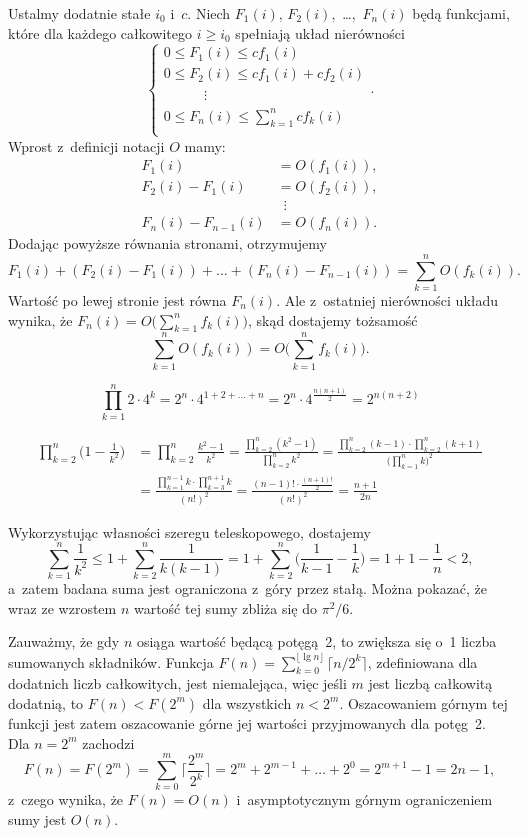 Ustalmy dodatnie stałe $i_0$ i~$c$.
Niech $F_1(i)$, $F_2(i)$,~\dots,~$F_n(i)$ będą funkcjami, które dla każdego całkowitego $i\ge i_0$ spełniają układ nierówności
\[
	\begin{cases}
		0 \le F_1(i) \le cf_1(i) \\
		0 \le F_2(i) \le cf_1(i)+cf_2(i) \\
		\phantom{0 \le F_2} \vdots \\
		0 \le F_n(i) \le \sum_{k=1}^ncf_k(i) \\
	\end{cases}.
\]
Wprost z~definicji notacji $O$ mamy:
\begin{align*}
	F_1(i) &= O(f_1(i)), \\
	F_2(i)-F_1(i) &= O(f_2(i)), \\
	& \,\,\,\vdots \\
	F_n(i)-F_{n-1}(i) &= O(f_n(i)).
\end{align*}
Dodając powyższe równania stronami, otrzymujemy
\[
	F_1(i)+(F_2(i)-F_1(i))+\dots+(F_n(i)-F_{n-1}(i)) = \sum_{k=1}^nO(f_k(i)).
\]
Wartość po lewej stronie jest równa $F_n(i)$.
Ale z~ostatniej nierówności układu wynika, że $F_n(i)=O\bigl(\sum_{k=1}^nf_k(i)\bigr)$, skąd dostajemy tożsamość
\[
	\sum_{k=1}^nO(f_k(i)) = O\biggl(\sum_{k=1}^nf_k(i)\biggr).
\]

\exercise %
\[
	\prod_{k=1}^n2\cdot4^k = 2^n\cdot4^{1+2+\dots+n} = 2^n\cdot4^{\frac{n(n+1)}{2}} = 2^{n(n+2)}
\]

\exercise %
\begin{align*}
	\prod_{k=2}^n\biggl(1-\frac{1}{k^2}\biggr) &= \prod_{k=2}^n\frac{k^2-1}{k^2} = \frac{\prod_{k=2}^n(k^2-1)}{\prod_{k=2}^nk^2} = \frac{\prod_{k=2}^n(k-1)\cdot\prod_{k=2}^n(k+1)}{\bigl(\prod_{k=1}^nk\bigr)^2} \\[2mm]
	&= \frac{\prod_{k=1}^{n-1}k\cdot\prod_{k=3}^{n+1}k}{(n!)^2} = \frac{(n-1)!\cdot\frac{(n+1)!}{2}}{(n!)^2} = \frac{n+1}{2n}
\end{align*}


\exercise %
Wykorzystując własności szeregu teleskopowego, dostajemy
\[
	\sum_{k=1}^n\frac{1}{k^2} \le 1+\sum_{k=2}^n\frac{1}{k(k-1)} = 1+\sum_{k=2}^n\biggl(\frac{1}{k-1}-\frac{1}{k}\biggr) = 1+1-\frac{1}{n} < 2,
\]
a~zatem badana suma jest ograniczona z~góry przez stałą.
Można pokazać, że wraz ze wzrostem $n$ wartość tej sumy zbliża się do $\pi^2\!/6$.

\exercise %
Zauważmy, że gdy $n$ osiąga wartość będącą potęgą~2, to zwiększa się o~1 liczba sumowanych składników.
Funkcja $F(n)=\sum_{k=0}^{\lfloor\lg n\rfloor}\bigl\lceil n/2^k\bigr\rceil$, zdefiniowana dla dodatnich liczb całkowitych, jest niemalejąca, więc jeśli $m$ jest liczbą całkowitą dodatnią, to $F(n)<F(2^m)$ dla wszystkich $n<2^m$.
Oszacowaniem górnym tej funkcji jest zatem oszacowanie górne jej wartości przyjmowanych dla potęg~2.
Dla $n=2^m$ zachodzi
\[
	F(n) = F(2^m) = \sum_{k=0}^m\biggl\lceil\frac{2^m}{2^k}\biggr\rceil = 2^m+2^{m-1}+\dots+2^0 = 2^{m+1}-1 = 2n-1,
\]
z~czego wynika, że $F(n)=O(n)$ i~asymptotycznym górnym ograniczeniem sumy jest $O(n)$.

